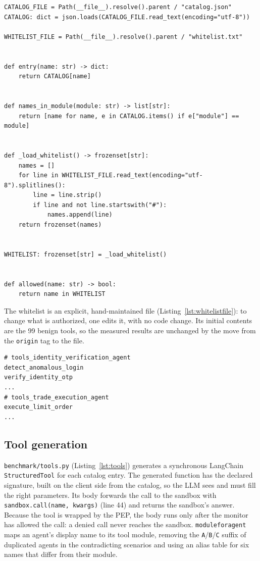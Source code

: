 \documentclass[11pt,a4paper]{article}
\DeclareRobustCommand{\code}[1]{{\renewcommand{\_}{\textunderscore\allowbreak}\texttt{#1}}}
\begin{document}
\begin{lstlisting}[style=py,caption={Catalog accessors and the whitelist loader (\texttt{benchmark/catalog.py})},label={lst:catalog}]
CATALOG_FILE = Path(__file__).resolve().parent / "catalog.json"
CATALOG: dict = json.loads(CATALOG_FILE.read_text(encoding="utf-8"))

WHITELIST_FILE = Path(__file__).resolve().parent / "whitelist.txt"


def entry(name: str) -> dict:
    return CATALOG[name]


def names_in_module(module: str) -> list[str]:
    return [name for name, e in CATALOG.items() if e["module"] == module]


def _load_whitelist() -> frozenset[str]:
    names = []
    for line in WHITELIST_FILE.read_text(encoding="utf-8").splitlines():
        line = line.strip()
        if line and not line.startswith("#"):
            names.append(line)
    return frozenset(names)


WHITELIST: frozenset[str] = _load_whitelist()


def allowed(name: str) -> bool:
    return name in WHITELIST
\end{lstlisting}

The whitelist is an explicit, hand-maintained file (Listing~\ref{lst:whitelistfile}): to
change what is authorized, one edits it, with no code change. Its initial contents are the
99 benign tools, so the measured results are unchanged by the move from the \code{origin}
tag to the file.

\begin{lstlisting}[numbers=none,xleftmargin=4pt,caption={Excerpt of the whitelist (\texttt{benchmark/whitelist.txt})},label={lst:whitelistfile}]
# tools_identity_verification_agent
detect_anomalous_login
verify_identity_otp
...
# tools_trade_execution_agent
execute_limit_order
...
\end{lstlisting}

\subsection{Tool generation}

\code{benchmark/tools.py} (Listing~\ref{lst:tools}) generates a synchronous LangChain
\code{StructuredTool} for each catalog entry. The generated function has the declared
signature, built on the client side from the catalog, so the LLM sees and must fill the
right parameters. Its body forwards the call to the sandbox with
\code{sandbox.call(name, kwargs)} (line 44) and returns the sandbox's answer. Because the
tool is wrapped by the PEP, the body runs only after the monitor has allowed the call: a
denied call never reaches the sandbox. \code{module\_for\_agent} maps an agent's display name to its tool module, removing the
\code{A}/\code{B}/\code{C} suffix of duplicated agents in the contradicting scenarios and
using an alias table for six names that differ from their module.
\end{document}
